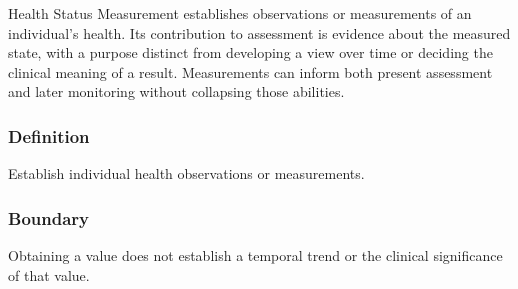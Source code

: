 Health Status Measurement establishes observations or measurements of an individual's health. Its contribution to assessment is evidence about the measured state, with a purpose distinct from developing a view over time or deciding the clinical meaning of a result. Measurements can inform both present assessment and later monitoring without collapsing those abilities.

\subsubsection*{Definition}

Establish individual health observations or measurements.

\subsubsection*{Boundary}

Obtaining a value does not establish a temporal trend or the clinical significance of that value.

